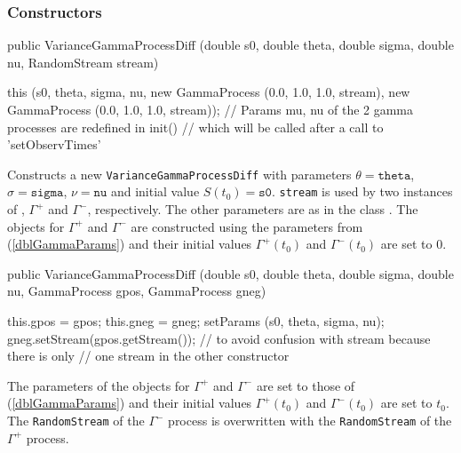 \subsubsection* {Constructors}
\begin{code}

   public VarianceGammaProcessDiff (double s0, double theta, double sigma,
                                    double nu, RandomStream stream) \begin{hide} {
        this (s0, theta, sigma, nu,
              new GammaProcess (0.0, 1.0, 1.0, stream),
              new GammaProcess (0.0, 1.0, 1.0, stream));
        // Params mu, nu of the 2 gamma processes are redefined in init()
        // which will be called after a call to 'setObservTimes'
    }\end{hide}
\end{code}
\begin{tabb}
Constructs a new \texttt{VarianceGammaProcessDiff} with parameters
$\theta = \texttt{theta}$, $\sigma = \texttt{sigma}$, $\nu = \texttt{nu}$
and initial value $S(t_{0}) = \texttt{s0}$. \texttt{stream} is
used by two instances of , $\Gamma^{+}$ and $\Gamma^{-}$,
respectively. The other parameters are
as in the class .
The  objects for $\Gamma^{+}$ and $\Gamma^{-}$ are
constructed using the parameters from (\ref{dblGammaParams}) and their
initial values  $\Gamma^{+}(t_{0})$ and $\Gamma^{-}(t_{0})$ are set to $0$.
\end{tabb}
\begin{code}

   public VarianceGammaProcessDiff (double s0, double theta, double sigma,
                                    double nu, GammaProcess gpos,
                                    GammaProcess gneg) \begin{hide} {
        this.gpos = gpos;
        this.gneg = gneg;
        setParams (s0, theta, sigma, nu);
        gneg.setStream(gpos.getStream());  // to avoid confusion with stream because there is only
                                 // one stream in the other constructor
    }\end{hide}
\end{code}
\begin{tabb}
The parameters of the 
objects for $\Gamma^{+}$ and $\Gamma^{-}$ are
set to those of (\ref{dblGammaParams}) and their
initial values  $\Gamma^{+}(t_{0})$ and $\Gamma^{-}(t_{0})$ are set to $t_0$.
The \texttt{RandomStream}  of the $\Gamma^{-}$ process is overwritten with the
\texttt{RandomStream}  of the $\Gamma^{+}$ process.
\end{tabb}
